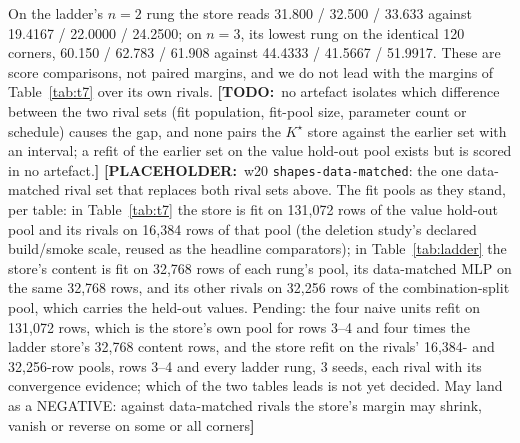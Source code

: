 \documentclass{article} %
\newcommand{\PLACEHOLDER}[1]{{\color{red}\textbf{[PLACEHOLDER:}~#1\textbf{]}}}
\newcommand{\TODO}[1]{{\color{orange}\textbf{[TODO:}~#1\textbf{]}}}
\newcommand{\Kstar}{\ensuremath{K^{\star}}}
\begin{document}
On the ladder's $n=2$ rung the store reads 31.800 / 32.500 / 33.633 against 19.4167 / %
22.0000 / 24.2500; on $n=3$, its lowest rung on the identical 120 corners, 60.150 / 62.783 / %
61.908 against 44.4333 / 41.5667 / 51.9917. %
These are score comparisons, not paired margins, and we do not lead with the margins of
Table~\ref{tab:t7} over its own rivals.
\TODO{no artefact isolates which difference between the two rival sets (fit population, fit-pool
size, parameter count or schedule) causes the gap, and none pairs the $\Kstar$ store against the
earlier set with an interval; a refit of the earlier set on the value hold-out pool exists but is
scored in no artefact.}
\PLACEHOLDER{w20 \texttt{shapes-data-matched}: the one data-matched rival set that replaces both
rival sets above. The fit pools as they stand, per table: in Table~\ref{tab:t7} the store is fit on
131,072 rows of the value hold-out pool and its rivals on 16,384 rows of that pool (the deletion
study's declared build/smoke scale, reused as the headline comparators); in Table~\ref{tab:ladder}
the store's content is fit on 32,768 rows of each rung's pool, its data-matched MLP on the same
32,768 rows, and its other rivals on 32,256 rows of the combination-split pool, which carries the
held-out values. Pending: the four naive units refit on 131,072 rows, which is the store's own pool
for rows 3--4 and four times the ladder store's 32,768 content rows, and the store refit on the
rivals' 16,384- and 32,256-row pools, rows 3--4 and every ladder rung, 3 seeds, each rival with its
convergence evidence; which of the two tables leads is not yet decided. May land as a NEGATIVE:
against data-matched rivals the store's margin may shrink, vanish or reverse on some or all corners}
\end{document}
